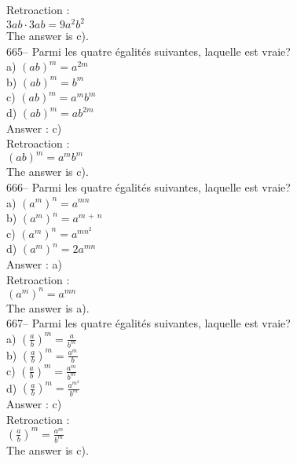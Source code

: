 ﻿\documentclass[letterpaper, 12pt]{article}
\begin{document}
Retroaction : \\
$3ab\cdot3ab=9a^{2}b^{2}$\\
The answer is c).\\

665-- Parmi les quatre \'egalit\'es suivantes, laquelle est vraie?\\
a) $\left( ab\right) ^m=a^{2m}$\\
b) $\left( ab\right) ^m=b^{m}$\\
c) $\left( ab\right) ^m=a^{m}b^{m}$\\
d) $\left( ab\right) ^m=ab^{2m}$\\

Answer : c)\\

Retroaction : \\
$\left( ab\right) ^m=a^{m}b^{m}$\\
The answer is c).\\

666-- Parmi les quatre \'egalit\'es suivantes, laquelle est vraie?\\
a) $\left( a^{m}\right)^{n}=a^{mn}$ \\
b) $\left( a^{m}\right)^{n}=a^{m\,+\,n}$ \\
c) $\left( a^{m}\right)^{n}=a^{mn^{2}}$ \\
d) $\left( a^{m}\right)^{n}=2a^{mn}$ \\

Answer : a)\\

Retroaction : \\
$\left( a^{m}\right)^{n}=a^{mn}$ \\
The answer is a).\\

667-- Parmi les quatre \'egalit\'es suivantes, laquelle est vraie?\\
a) $\left( \frac{a}{b}\right)^{m} =\frac{a}{b^{m}}$\\[2mm]
b) $\left( \frac{a}{b}\right)^{m} =\frac{a^{m}}{b}$\\[2mm]
c) $\left( \frac{a}{b}\right)^{m} =\frac{a^{m}}{b^{m}}$\\[2mm]
d) $\left( \frac{a}{b}\right)^{m} =\frac{a^{m^{2}}}{b^{m}}$\\

Answer : c)\\

Retroaction : \\[2mm]
$\left( \frac{a}{b}\right)^{m} =\frac{a^{m}}{b^{m}}$\\[2mm]
The answer is c).\\
\end{document}
